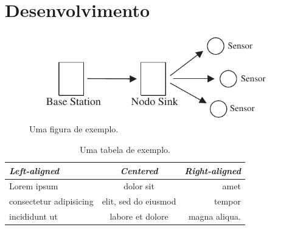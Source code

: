 \chapter{Desenvolvimento}

\dummytxtb\dummytxta\dummytxtc

\begin{figure}[ht]
    \centering
    \includegraphics{img/exemplo}
    \caption{Uma figura de exemplo.}
\end{figure}

\dummytxtb

\begin{table}[ht]
    \caption{Uma tabela de exemplo.}
    {\centering
    \begin{tabular}{lcr} \toprule
    \emph{Left-aligned} & \emph{Centered} & \emph{Right-aligned} \\ \midrule
    Lorem ipsum & dolor sit & amet \\
    consectetur adipisicing & elit, sed do eiusmod & tempor \\
    incididunt ut & labore et dolore & magna aliqua. \\ \bottomrule
    \end{tabular}\par
    }
\end{table}
